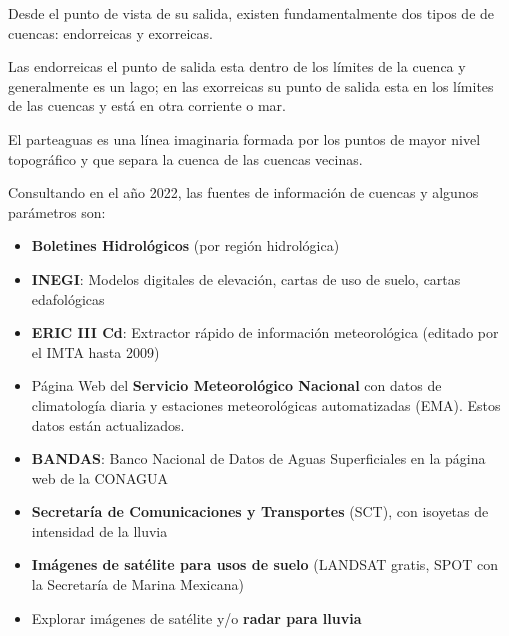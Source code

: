 Desde el punto de vista de su salida, existen fundamentalmente dos tipos de de cuencas: endorreicas y exorreicas.

Las endorreicas el punto de salida esta dentro de los límites de la cuenca y generalmente es un lago; en las exorreicas su punto de salida esta en los límites de las cuencas y está en otra corriente o mar.

El parteaguas es una línea imaginaria formada por los puntos de mayor nivel topográfico y que separa la cuenca de las cuencas vecinas.

Consultando en el año 2022, las fuentes de información de cuencas y algunos parámetros son:
\begin{itemize}
    \item \textbf{Boletines Hidrológicos} (por región hidrológica)
    \item \textbf{INEGI}: Modelos digitales de elevación, cartas de uso de suelo, cartas edafológicas
    \item \textbf{ERIC III Cd}: Extractor rápido de información meteorológica (editado por el IMTA hasta 2009)
    \item Página Web del \textbf{Servicio Meteorológico Nacional} con datos de climatología diaria y estaciones meteorológicas automatizadas (EMA). Estos datos están actualizados.
    \item \textbf{BANDAS}: Banco Nacional de Datos de Aguas Superficiales en la página web de la CONAGUA
    \item \textbf{Secretaría de Comunicaciones y Transportes} (SCT), con isoyetas de intensidad de la lluvia
    \item \textbf{Imágenes de satélite para usos de suelo} (LANDSAT gratis, SPOT con la Secretaría de Marina Mexicana)
    \item Explorar imágenes de satélite y/o \textbf{radar para lluvia}
\end{itemize}

